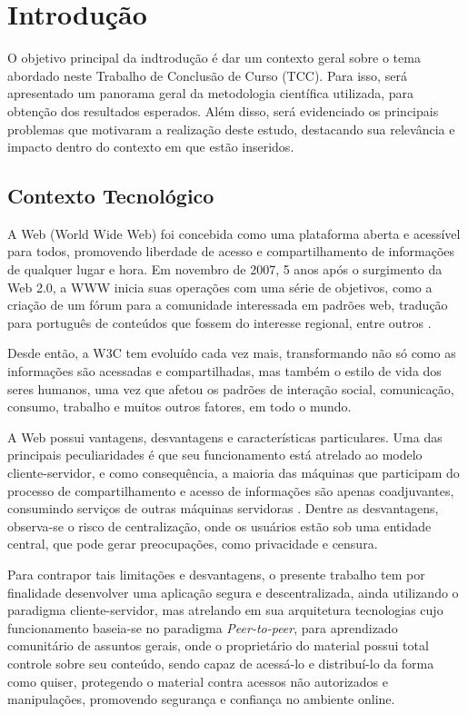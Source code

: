 \chapter[Introdução]{Introdução}
\label{cap:introducao}

O objetivo principal da indtrodução é dar um contexto geral sobre o tema abordado neste Trabalho de Conclusão de Curso (TCC). Para isso, será apresentado um panorama geral da metodologia científica utilizada, para obtenção dos resultados esperados. Além disso, será evidenciado os principais problemas que motivaram a realização deste estudo, destacando sua relevância e impacto dentro do contexto em que estão inseridos. 

\section{Contexto Tecnológico}

A Web (World Wide Web) foi concebida como uma plataforma aberta e acessível para todos, promovendo liberdade de acesso e compartilhamento de informações de qualquer lugar e hora. Em novembro de 2007, 5 anos após o surgimento da Web 2.0, a WWW inicia suas operações com uma série de objetivos, como a criação de um fórum para a comunidade interessada em padrões web, tradução para português de conteúdos que fossem do interesse regional, entre outros \cite{vieira2014}.

Desde então, a W3C tem evoluído cada vez mais, transformando não só como as informações são acessadas e compartilhadas, mas também o estilo de vida dos seres humanos, uma vez que afetou os padrões de interação social, comunicação, consumo, trabalho e muitos outros fatores, em todo o mundo.

A Web possui vantagens, desvantagens e características particulares. Uma das principais peculiaridades é que seu funcionamento está atrelado ao modelo cliente-servidor, e como consequência, a maioria das máquinas que participam do processo de compartilhamento e acesso de informações são apenas coadjuvantes, consumindo serviços de outras máquinas servidoras \cite{rocha2004p2p}. Dentre as desvantagens, observa-se o risco de centralização, onde os usuários estão sob uma entidade central, que pode gerar preocupações, como privacidade e censura. 

Para contrapor tais limitações e desvantagens, o presente trabalho tem por finalidade desenvolver uma aplicação segura e descentralizada, ainda utilizando o paradigma cliente-servidor, mas atrelando em sua arquitetura tecnologias cujo funcionamento baseia-se no paradigma \textit{Peer-to-peer}, para aprendizado comunitário de assuntos gerais, onde o proprietário do material possui total controle sobre seu conteúdo, sendo capaz de acessá-lo e distribuí-lo da forma como quiser, protegendo o material contra acessos não autorizados e manipulações, promovendo segurança e confiança no ambiente online.

